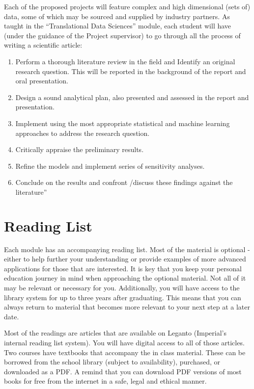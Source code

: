 \documentclass[
]{book}
\providecommand{\tightlist}{%
  \setlength{\itemsep}{0pt}\setlength{\parskip}{0pt}}
\begin{document}
Each of the proposed projects will feature complex and high dimensional (sets of) data, some of which may be sourced and supplied by industry partners. As taught in the ``Translational Data Sciences'' module, each student will have (under the guidance of the Project supervisor) to go through all the process of writing a scientific article:

\begin{enumerate}
\def\labelenumi{\arabic{enumi}.}
\tightlist
\item
  Perform a thorough literature review in the field and Identify an original research question. This will be reported in the background of the report and oral presentation.
\item
  Design a sound analytical plan, also presented and assessed in the report and presentation.
\item
  Implement using the most appropriate statistical and machine learning approaches to address the research question.
\item
  Critically appraise the preliminary results.
\item
  Refine the models and implement series of sensitivity analyses.
\item
  Conclude on the results and confront /discuss these findings against the literature''
\end{enumerate}

\chapter{Reading List}\label{reading-list}

Each module has an accompanying reading list. Most of the material is optional - either to help further your understanding or provide examples of more advanced applications for those that are interested. It is key that you keep your personal education journey in mind when approaching the optional material. Not all of it may be relevant or necessary for you. Additionally, you will have access to the library system for up to three years after graduating. This means that you can always return to material that becomes more relevant to your next step at a later date.

Most of the readings are articles that are available on Leganto (Imperial's internal reading list system). You will have digital access to all of those articles. Two courses have textbooks that accompany the in class material. These can be borrowed from the school library (subject to availability), purchased, or downloaded as a PDF. A remind that you can download PDF versions of most books for free from the internet in a safe, legal and ethical manner.
\end{document}
